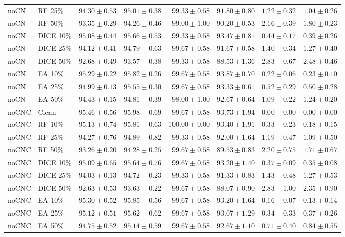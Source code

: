 {\begin{longtable}{llrrrrrr}
noCN & RF 25\% & $94.30\pm0.53$ & $95.01\pm0.38$ & $99.33\pm0.58$ & $91.80\pm0.80$ & $1.22\pm0.32$ & $1.04\pm0.26$ \\
noCN & RF 50\% & $93.35\pm0.29$ & $94.26\pm0.46$ & $99.00\pm1.00$ & $90.20\pm0.53$ & $2.16\pm0.39$ & $1.80\pm0.23$ \\
noCN & DICE 10\% & $95.08\pm0.44$ & $95.66\pm0.53$ & $99.33\pm0.58$ & $93.47\pm0.81$ & $0.44\pm0.17$ & $0.39\pm0.26$ \\
noCN & DICE 25\% & $94.12\pm0.41$ & $94.79\pm0.63$ & $99.67\pm0.58$ & $91.67\pm0.58$ & $1.40\pm0.34$ & $1.27\pm0.40$ \\
noCN & DICE 50\% & $92.68\pm0.49$ & $93.57\pm0.38$ & $99.33\pm0.58$ & $88.53\pm1.36$ & $2.83\pm0.67$ & $2.48\pm0.46$ \\
noCN & EA 10\% & $95.29\pm0.22$ & $95.82\pm0.26$ & $99.67\pm0.58$ & $93.87\pm0.70$ & $0.22\pm0.06$ & $0.23\pm0.10$ \\
noCN & EA 25\% & $94.99\pm0.13$ & $95.55\pm0.30$ & $99.67\pm0.58$ & $93.33\pm0.61$ & $0.52\pm0.29$ & $0.50\pm0.28$ \\
noCN & EA 50\% & $94.43\pm0.15$ & $94.81\pm0.39$ & $98.00\pm1.00$ & $92.67\pm0.64$ & $1.09\pm0.22$ & $1.24\pm0.20$ \\
noCNC & Clean & $95.46\pm0.56$ & $95.98\pm0.69$ & $99.67\pm0.58$ & $93.73\pm1.94$ & $0.00\pm0.00$ & $0.00\pm0.00$ \\
noCNC & RF 10\% & $95.13\pm0.74$ & $95.81\pm0.63$ & $100.00\pm0.00$ & $93.40\pm1.91$ & $0.33\pm0.23$ & $0.18\pm0.15$ \\
noCNC & RF 25\% & $94.27\pm0.76$ & $94.89\pm0.82$ & $99.33\pm0.58$ & $92.00\pm1.64$ & $1.19\pm0.47$ & $1.09\pm0.50$ \\
noCNC & RF 50\% & $93.26\pm0.20$ & $94.28\pm0.25$ & $99.67\pm0.58$ & $89.53\pm0.83$ & $2.20\pm0.75$ & $1.71\pm0.67$ \\
noCNC & DICE 10\% & $95.09\pm0.65$ & $95.64\pm0.76$ & $99.67\pm0.58$ & $93.20\pm1.40$ & $0.37\pm0.09$ & $0.35\pm0.08$ \\
noCNC & DICE 25\% & $94.03\pm0.13$ & $94.72\pm0.23$ & $99.33\pm0.58$ & $91.33\pm0.83$ & $1.43\pm0.48$ & $1.27\pm0.53$ \\
noCNC & DICE 50\% & $92.63\pm0.53$ & $93.63\pm0.22$ & $99.67\pm0.58$ & $88.07\pm0.90$ & $2.83\pm1.00$ & $2.35\pm0.90$ \\
noCNC & EA 10\% & $95.30\pm0.52$ & $95.85\pm0.56$ & $99.67\pm0.58$ & $93.20\pm1.64$ & $0.16\pm0.07$ & $0.13\pm0.14$ \\
noCNC & EA 25\% & $95.12\pm0.51$ & $95.62\pm0.62$ & $99.67\pm0.58$ & $93.07\pm1.29$ & $0.34\pm0.33$ & $0.37\pm0.26$ \\
noCNC & EA 50\% & $94.75\pm0.52$ & $95.14\pm0.59$ & $99.67\pm0.58$ & $92.67\pm1.10$ & $0.71\pm0.40$ & $0.84\pm0.55$ \\
\end{longtable}
}

